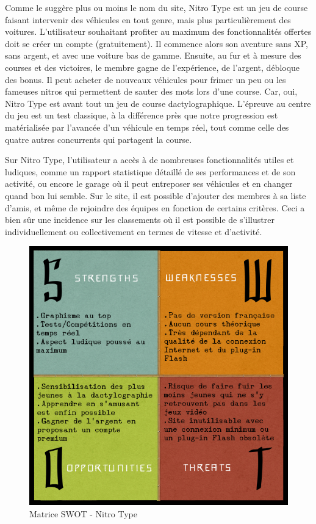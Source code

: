 \documentclass[a4paper,12pt]{article}
\begin{document}
Comme le suggère plus ou moins le nom du site, Nitro Type est un jeu de course faisant intervenir des véhicules en tout genre, mais plus particulièrement des voitures. L'utilisateur souhaitant profiter au maximum des fonctionnalités offertes doit se créer un compte (gratuitement). Il commence alors son aventure sans XP, sans argent, et avec une voiture bas de gamme. Ensuite, au fur et à mesure des courses et des victoires, le membre gagne de l'expérience, de l'argent, débloque des bonus. Il peut acheter de nouveaux véhicules pour frimer un peu ou les fameuses nitros qui permettent de sauter des mots lors d'une course. Car, oui, Nitro Type est avant tout un jeu de course dactylographique. L'épreuve au centre du jeu est un test classique, à la différence près que notre progression est matérialisée par l'avancée d'un véhicule en temps réel, tout comme celle des quatre autres concurrents qui partagent la course.

Sur Nitro Type, l'utilisateur a accès à de nombreuses fonctionnalités utiles et ludiques, comme un rapport statistique détaillé de ses performances et de son activité, ou encore le garage où il peut entreposer ses véhicules et en changer quand bon lui semble. Sur le site, il est possible d'ajouter des membres à sa liste d'amis, et même de rejoindre des équipes en fonction de certains critères. Ceci a bien sûr une incidence sur les classements où il est possible de s'illustrer individuellement ou collectivement en termes de vitesse et d'activité.

\begin{figure}
\begin{center}
\includegraphics[scale=0.5]{swot-nitrotype.png}
\end{center}
\caption{Matrice SWOT - Nitro Type}
\end{figure}
\end{document}
